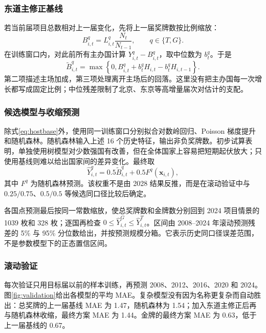 \documentclass[UTF8,11pt,a4paper]{ctexart}
\begin{document}
\subsubsection{东道主修正基线}

若当前届项目总数相对上一届变化，先将上一届奖牌数按比例缩放：
\begin{equation}
B^q_{i,t}=L^q_{i,t}\frac{N_t}{N_{t-1}},\qquad q\in\{T,G\}.
\end{equation}
在训练窗口内，对此前所有主办国计算 $Y^q_{i,t}-B^q_{i,t}$，取中位数为 $b^q_t$。于是
\begin{equation}
\widetilde{B}^q_{i,t}=\max\left\{0,
B^q_{i,t}+b^q_t H_{i,t}-b^q_t H_{i,t-1}\right\}.
\label{eq:hostbase}
\end{equation}
第二项描述主场加成，第三项处理离开主场后的回落。这里没有把主办国每一次增长都写成固定比例；中位残差限制了北京、东京等高增量届次对估计的支配。

\subsubsection{候选模型与收缩预测}

除式\eqref{eq:hostbase}外，使用同一训练窗口分别拟合对数岭回归、Poisson 梯度提升和随机森林。随机森林输入上述 16 个历史特征，输出非负奖牌数。初步试算表明，单独使用树模型对少数强国有改善，但在全体国家上容易把短期起伏放大；只使用基线则难以给出国家间的差异变化。最终取
\begin{equation}
\widehat{Y}^q_{i,t}=0.5\widetilde{B}^q_{i,t}+0.5F^q(\boldsymbol{x}_{i,t}),
\label{eq:blend}
\end{equation}
其中 $F^q$ 为随机森林预测。该权重不是由 2028 结果反推，而是在滚动验证中与 $0.25/0.75$、$0.5/0.5$ 等候选同口径比较后确定。

各国点预测最后按同一常数缩放，使总奖牌数和金牌数分别回到 2024 项目情景的 1039 枚和 328 枚；逐国再检查 $0\leq \widehat{Y}^G_{i,t}\leq \widehat{Y}^T_{i,t}$。区间由 2008--2024 年滚动预测残差的 5\% 与 95\% 分位数给出，并按预测规模分箱。它表示历史同口径误差范围，不是参数模型下的正态置信区间。

\subsubsection{滚动验证}

每次验证只用目标届以前的样本训练，再预测 2008、2012、2016、2020 和 2024。图\ref{fig:validation}给出各模型的平均 MAE。复杂模型没有因为名称更复杂而自动胜出：总奖牌的上一届基线 MAE 为 1.47，随机森林为 1.54；加入东道主修正后再与随机森林收缩，最终方案 MAE 为 1.44。金牌的最终方案 MAE 为 0.63，低于上一届基线的 0.67。
\end{document}
